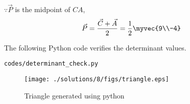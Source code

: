 $\because \vec{P}$ is the midpoint of $CA$,
\begin{align}
\vec{P}= \frac{\vec{C}+\vec{A}}{2} = \frac{1}{2}\myvec{9\\-4}
\label{eq:constr_p}
\end{align}
%
%
%

The  following Python code verifies the determinant values.

\begin{lstlisting}
codes/determinant_check.py
\end{lstlisting}

\begin{figure}[!ht]
\centering
\texttt{[image: ./solutions/8/figs/triangle.eps]}
\caption{Triangle generated using python}
\label{fig:tri_geo_8_tri_sss_py}
\end{figure}

